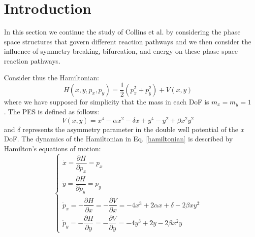 \documentclass[10pt,aps,onecolumn,superscriptaddress]{revtex4-2}
\begin{document}
\maketitle



\section{Introduction}


In this section we continue the study of Collins et al. \cite{collins2011} by considering the phase space structures that govern different reaction pathways and we  then consider the influence of symmetry breaking, bifurcation, and energy on these phase space reaction pathways.

Consider thus the Hamiltonian:
\begin{equation}
H(x,y,p_x,p_y) = \frac{1}{2}\left(p_x^2 + p_y^2\right) + V(x,y)
\label{hamiltonian}
\end{equation}
where we have supposed for simplicity that the mass in each DoF is $m_x = m_y = 1$. The PES is defined as follows:
\begin{equation}
V(x,y) = x^4 - \alpha x^2 - \delta x + y^4 - y^2 + \beta x^2 y^2
\label{pes_model}
\end{equation}
and $\delta$ represents the asymmetry parameter in the double well potential of the $x$ DoF. The dynamics of the Hamiltonian in Eq. \eqref{hamiltonian} is described by Hamilton's equations of motion:
\begin{equation}
\begin{cases}
\dot{x} = \dfrac{\partial H}{\partial p_x} = p_x \\[.4cm]
\dot{y} = \dfrac{\partial H}{\partial p_y} = p_y \\[.4cm]
\dot{p}_x = -\dfrac{\partial H}{\partial x} = -\dfrac{\partial V}{\partial x} = -4 x^3 + 2 \alpha x + \delta - 2 \beta x y^2 \\[.4cm]
\dot{p}_y = -\dfrac{\partial H}{\partial y} = -\dfrac{\partial V}{\partial y} = -4 y^3 + 2 y - 2 \beta x^2 y
\end{cases}
\label{ham_eqs}
\end{equation}
\end{document}
